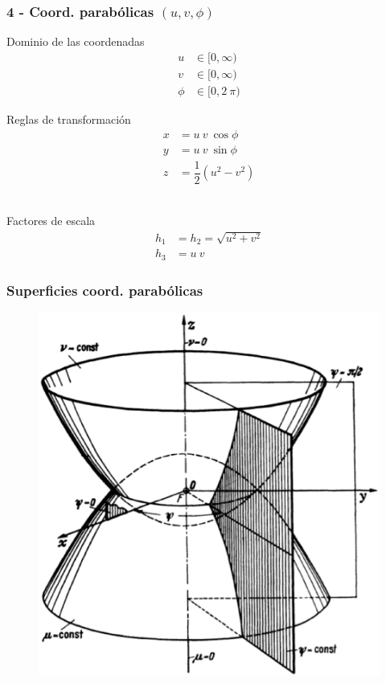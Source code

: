 \documentclass[12pt]{beamer}
\begin{document}
\begin{frame}
\frametitle{4 - Coord. parabólicas $(u, v, \phi)$}
\fontsize{12}{12}\selectfont
\begin{minipage}{0.45\textwidth}
Dominio de las coordenadas
\begin{align*}
u &\in [0, \infty) \\
v &\in [0, \infty) \\
\phi &\in [0, 2 \: \pi)
\end{align*}
\end{minipage}
\hspace{1cm}
\begin{minipage}{0.4\textwidth}
Reglas de transformación
\begin{align*}
x &= u \: v \: \cos \phi \\
y &= u \: v \: \sin \phi \\
z &= \dfrac{1}{2} (u^{2} - v^{2})
\end{align*}
\end{minipage}
\\
\bigskip
Factores de escala
\begin{align*}
h_{1} &= h_{2} = \sqrt{u^{2 } +v^{2}} \\
h_{3} &= u \: v
\end{align*}
\end{frame}
\begin{frame}
\frametitle{Superficies coord. parabólicas}
\begin{figure}[H]
\centering
\includegraphics[scale=0.3]{Imagenes/Sistema_Parabolico.eps}
\end{figure}
\end{frame}
\end{document}
